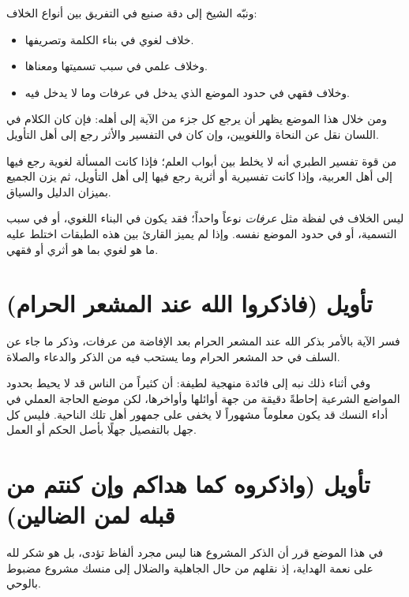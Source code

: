 ونبّه الشيخ إلى دقة صنيع  في التفريق بين أنواع الخلاف:
\begin{itemize}
    \item خلاف لغوي في بناء الكلمة وتصريفها.
    \item وخلاف علمي في سبب تسميتها ومعناها.
    \item وخلاف فقهي في حدود الموضع الذي يدخل في عرفات وما لا يدخل فيه.
\end{itemize}

ومن خلال هذا الموضع يظهر أن  يرجع كل جزء من الآية إلى أهله: فإن كان الكلام في اللسان نقل عن النحاة واللغويين، وإن كان في التفسير والأثر رجع إلى أهل التأويل.

\begin{fawaid}
من قوة تفسير الطبري أنه لا يخلط بين أبواب العلم؛ فإذا كانت المسألة لغوية رجع فيها إلى أهل العربية، وإذا كانت تفسيرية أو أثرية رجع فيها إلى أهل التأويل، ثم يزن الجميع بميزان الدليل والسياق.
\end{fawaid}

\begin{fawaid}
ليس الخلاف في لفظة مثل \textit{عرفات} نوعاً واحداً؛ فقد يكون في البناء اللغوي، أو في سبب التسمية، أو في حدود الموضع نفسه. وإذا لم يميز القارئ بين هذه الطبقات اختلط عليه ما هو لغوي بما هو أثري أو فقهي.
\end{fawaid}

\section{تأويل (فاذكروا الله عند المشعر الحرام)}
فسر  الآية بالأمر بذكر الله عند المشعر الحرام بعد الإفاضة من عرفات، وذكر ما جاء عن السلف في حد المشعر الحرام وما يستحب فيه من الذكر والدعاء والصلاة.

وفي أثناء ذلك نبه إلى فائدة منهجية لطيفة: أن كثيراً من الناس قد لا يحيط بحدود المواضع الشرعية إحاطةً دقيقة من جهة أوائلها وأواخرها، لكن موضع الحاجة العملي في أداء النسك قد يكون معلوماً مشهوراً لا يخفى على جمهور أهل تلك الناحية. فليس كل جهل بالتفصيل جهلًا بأصل الحكم أو العمل.

\section{تأويل (واذكروه كما هداكم وإن كنتم من قبله لمن الضالين)}
في هذا الموضع قرر  أن الذكر المشروع هنا ليس مجرد ألفاظ تؤدى، بل هو شكر لله على نعمة الهداية، إذ نقلهم من حال الجاهلية والضلال إلى منسك مشروع مضبوط بالوحي.

